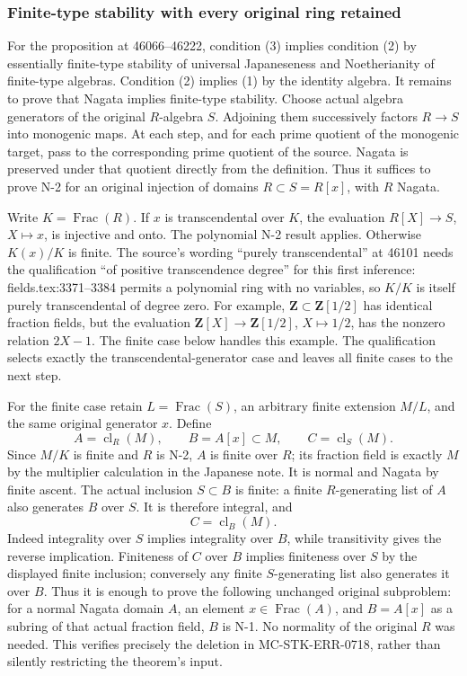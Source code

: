 \subsubsection{Finite-type stability with every original ring retained}\label{algebra-proof-067-finite-type-stability-with-every-original-ring-retained}

For the proposition at 46066--46222, condition (3) implies condition (2) by essentially finite-type stability of universal Japaneseness and Noetherianity of finite-type algebras. Condition (2) implies (1) by the identity algebra. It remains to prove that Nagata implies finite-type stability. Choose actual algebra generators of the original \(R\)-algebra \(S\). Adjoining them successively factors \(R\to S\) into monogenic maps. At each step, and for each prime quotient of the monogenic target, pass to the corresponding prime quotient of the source. Nagata is preserved under that quotient directly from the definition. Thus it suffices to prove N-2 for an original injection of domains \(R\subset S=R[x]\), with \(R\) Nagata.

Write \(K=\operatorname{Frac}(R)\). If \(x\) is transcendental over \(K\), the evaluation \(R[X]\to S\), \(X\mapsto x\), is injective and onto. The polynomial N-2 result applies. Otherwise \(K(x)/K\) is finite. The source's wording ``purely transcendental'' at 46101 needs the qualification ``of positive transcendence degree'' for this first inference: fields.tex:3371--3384 permits a polynomial ring with no variables, so \(K/K\) is itself purely transcendental of degree zero. For example, \(\mathbf Z\subset\mathbf Z[1/2]\) has identical fraction fields, but the evaluation \(\mathbf Z[X]\to\mathbf Z[1/2]\), \(X\mapsto1/2\), has the nonzero relation \(2X-1\). The finite case below handles this example. The qualification selects exactly the transcendental-generator case and leaves all finite cases to the next step.

For the finite case retain \(L=\operatorname{Frac}(S)\), an arbitrary finite extension \(M/L\), and the same original generator \(x\). Define \[
 A=\operatorname{cl}_R(M),\qquad B=A[x]\subset M,
 \qquad C=\operatorname{cl}_S(M).
\] Since \(M/K\) is finite and \(R\) is N-2, \(A\) is finite over \(R\); its fraction field is exactly \(M\) by the multiplier calculation in the Japanese note. It is normal and Nagata by finite ascent. The actual inclusion \(S\subset B\) is finite: a finite \(R\)-generating list of \(A\) also generates \(B\) over \(S\). It is therefore integral, and \[
 C=\operatorname{cl}_B(M).
\] Indeed integrality over \(S\) implies integrality over \(B\), while transitivity gives the reverse implication. Finiteness of \(C\) over \(B\) implies finiteness over \(S\) by the displayed finite inclusion; conversely any finite \(S\)-generating list also generates it over \(B\). Thus it is enough to prove the following unchanged original subproblem: for a normal Nagata domain \(A\), an element \(x\in\operatorname{Frac}(A)\), and \(B=A[x]\) as a subring of that actual fraction field, \(B\) is N-1. No normality of the original \(R\) was needed. This verifies precisely the deletion in MC-STK-ERR-0718, rather than silently restricting the theorem's input.

